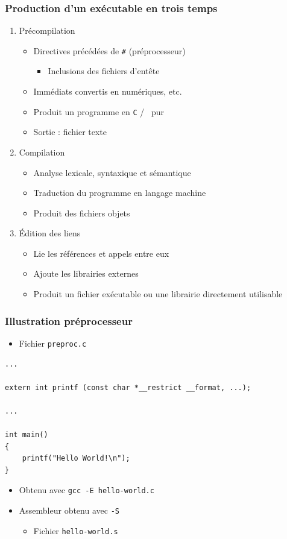 \begin{frame}
\frametitle{Production d'un exécutable en trois temps}
\begin{enumerate}[<+->]
\item Précompilation
	\begin{itemize}
	\item Directives précédées de \texttt{\#} (préprocesseur)
		\begin{itemize}
		\item Inclusions des fichiers d'entête		
		\end{itemize}
	\item Immédiats convertis en numériques, etc.
	\item Produit un programme en \texttt{C} / \cpp\ pur
	\item Sortie : fichier texte
	\end{itemize}
\item Compilation
	\begin{itemize}
	\item Analyse lexicale, syntaxique et sémantique
	\item Traduction du programme en langage machine
	\item Produit des fichiers objets
	\end{itemize}
\item Édition des liens
	\begin{itemize}
	\item Lie les références et appels entre eux
	\item Ajoute les librairies externes
	\item Produit un fichier exécutable ou une librairie directement utilisable
	\end{itemize}
\end{enumerate}
\end{frame}

\begin{frame}[containsverbatim]
\frametitle{Illustration préprocesseur}
\begin{itemize}
\item Fichier \texttt{preproc.c}
\end{itemize}
\begin{lstlisting}
... 

extern int printf (const char *__restrict __format, ...);

...

int main()
{
	printf("Hello World!\n");
}
\end{lstlisting}
\begin{itemize}
\item Obtenu avec \texttt{gcc -E hello-world.c}
\item Assembleur obtenu avec \texttt{-S}
	\begin{itemize}
	\item Fichier \texttt{hello-world.s}
	\end{itemize}
\end{itemize}
\end{frame}

